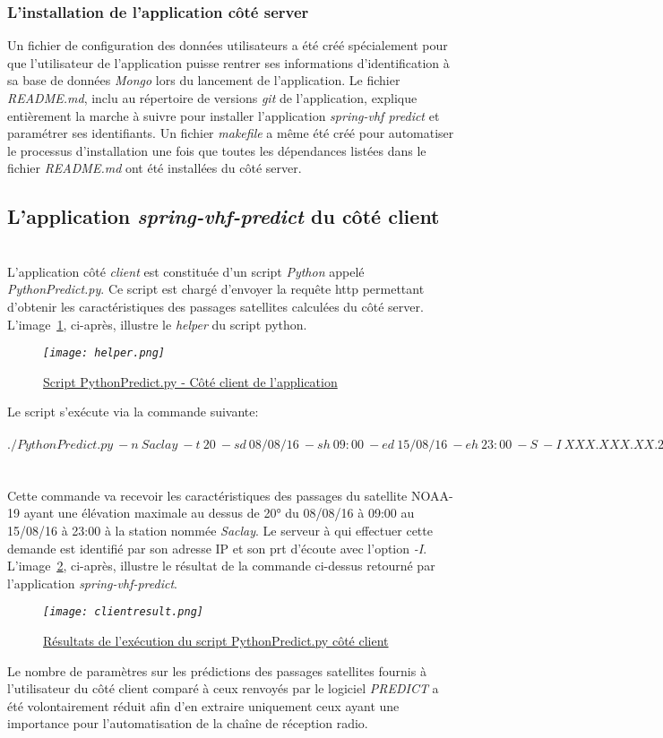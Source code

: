 \documentclass[12pt,fleqn]{book} %
\begin{document}
\subsubsection{L'installation de l'application côté server}
\noindent Un fichier de configuration des données utilisateurs a été créé spécialement pour que l'utilisateur de l'application puisse rentrer ses informations d'identification à sa base de données \emph{Mongo} lors du lancement de l'application. Le fichier \emph{README.md}, inclu au répertoire de versions \emph{git} de l'application, explique entièrement la marche à suivre pour installer l'application \emph{spring-vhf predict} et paramétrer ses identifiants. Un fichier \emph{makefile} a même été créé pour automatiser le processus d'installation une fois que toutes les dépendances listées dans le fichier \emph{README.md} ont été installées du côté server.
\subsection{L'application \emph{spring-vhf-predict} du côté client}
~\\\indent L'application côté \emph{client} est constituée d'un script \emph{Python} appelé \emph{PythonPredict.py}. Ce script est chargé d'envoyer la requête http permettant d'obtenir les caractéristiques des passages satellites calculées du côté server.
~\\L'image~\underline{\color{blue}\ref{helper}}, ci-après, illustre le \emph{helper} du script python.
\begin{figure}[H]
	\centering
	\itshape
	\texttt{[image: helper.png]}
	\caption{\label{helper} \underline{Script PythonPredict.py - Côté client de l'application}}
\end{figure}
Le script s'exécute via la commande suivante:
~\\\\$ ./PythonPredict.py\ -n\ Saclay\ -t\ 20\ -sd\ 08/08/16\ -sh\ 09:00\ -ed\ 15/08/16\ -eh\ 23:00\ -S\ -I\ XXX.XXX.XX.200:8000 $
~\\\\Cette commande va recevoir les caractéristiques des passages du satellite NOAA-19 ayant une élévation maximale au dessus de 20° du 08/08/16 à 09:00 au 15/08/16 à 23:00 à la station nommée \emph{Saclay}. Le serveur à qui effectuer cette demande est identifié par son adresse IP et son prt d'écoute avec l'option \emph{-I}.
~\\L'image~\underline{\color{blue}\ref{clientresult}}, ci-après, illustre le résultat de la commande ci-dessus retourné par l'application \emph{spring-vhf-predict}.
\begin{figure}[H]
	\centering
	\itshape
	\texttt{[image: clientresult.png]}
	\caption{\label{clientresult} \underline{Résultats de l'exécution du script PythonPredict.py côté client}}
\end{figure}
Le nombre de paramètres sur les prédictions des passages satellites fournis à l'utilisateur du côté client comparé à ceux renvoyés par le logiciel \emph{PREDICT} a été volontairement réduit afin d'en extraire uniquement ceux ayant une importance pour l'automatisation de la chaîne de réception radio. 
\end{document}
